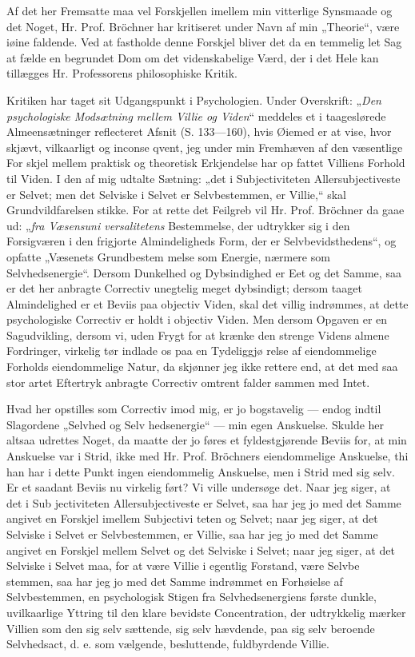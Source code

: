 \documentclass[12pt]{book}
\newcommand{\opage}[1]{\marginnote{\footnotesize\textit{[#1]}}}
\begin{document}
Af det her Fremsatte maa vel Forskjellen imellem
\opage{20}\setcounter{footnote}{0}%
min vitterlige Synsmaade og det Noget, Hr. Prof. Bröchner
har kritiseret under Navn af min „Theorie“, være iøine\-%
faldende. Ved at fastholde denne Forskjel bliver det da
en temmelig let Sag at fælde en begrundet Dom om det
videnskabelige Værd, der i det Hele kan tillægges Hr.
Professorens philosophiske Kritik.

Kritiken har taget sit Udgangspunkt i Psychologien.
Under Overskrift: „\emph{Den psychologiske Modsætning
mellem Villie og Viden}“ meddeles et i taageslørede
Almeensætninger reflecteret Afsnit (S. 133---160), hvis
Øiemed er at vise, hvor skjævt, vilkaarligt og inconse\-%
qvent, jeg under min Fremhæven af den væsentlige For\-%
skjel mellem praktisk og theoretisk Erkjendelse har op\-%
fattet Villiens Forhold til Viden. I den af mig udtalte
Sætning: „det i Subjectiviteten Allersubjectiveste er Selvet;
men det Selviske i Selvet er Selvbestemmen, er Villie,“
skal Grundvildfarelsen stikke. For at rette det Feilgreb
vil Hr. Prof. Bröchner da gaae ud: „\emph{fra Væsensuni\-%
versalitetens} Bestemmelse, der udtrykker sig i den
Forsigværen i den frigjorte Almindeligheds Form, der er
Selvbevidsthedens“, og opfatte „Væsenets Grundbestem\-%
melse som Energie, nærmere som Selvhedsenergie“.
Dersom Dunkelhed og Dybsindighed er Eet og det
Samme, saa er det her anbragte Correctiv unegtelig
meget dybsindigt; dersom taaget Almindelighed er et
Beviis paa objectiv Viden, skal det villig indrømmes, at
dette psychologiske Correctiv er holdt i objectiv Viden.
Men dersom Opgaven er en Sagudvikling, dersom vi,
uden Frygt for at krænke den strenge Videns almene
Fordringer, virkelig tør indlade os paa en Tydeliggjø\-%
relse af eiendommelige Forholds eiendommelige Natur,
da skjønner jeg ikke rettere end, at det med saa stor\-%
artet Eftertryk anbragte Correctiv omtrent falder sammen
med Intet.

\opage{21}\setcounter{footnote}{0}%
Hvad her opstilles som Correctiv imod mig, er jo
bogstavelig --- endog indtil Slagordene „Selvhed og Selv\-%
hedsenergie“ --- min egen Anskuelse. Skulde her altsaa
udrettes Noget, da maatte der jo føres et fyldestgjørende
Beviis for, at min Anskuelse var i Strid, ikke med Hr.
Prof. Bröchners eiendommelige Anskuelse, thi han har i
dette Punkt ingen eiendommelig Anskuelse, men i Strid
med sig selv. Er et saadant Beviis nu virkelig ført?
Vi ville undersøge det. Naar jeg siger, at det i Sub\-%
jectiviteten Allersubjectiveste er Selvet, saa har jeg jo
med det Samme angivet en Forskjel imellem Subjectivi\-%
teten og Selvet; naar jeg siger, at det Selviske i Selvet
er Selvbestemmen, er Villie, saa har jeg jo med det
Samme angivet en Forskjel mellem Selvet og det Selviske
i Selvet; naar jeg siger, at det Selviske i Selvet maa,
for at være Villie i egentlig Forstand, være Selvbe\-%
stemmen, saa har jeg jo med det Samme indrømmet en
Forhøielse af Selvbestemmen, en psychologisk Stigen fra
Selvhedsenergiens første dunkle, uvilkaarlige Yttring til
den klare bevidste Concentration, der udtrykkelig mærker
Villien som den sig selv sættende, sig selv hævdende,
paa sig selv beroende Selvhedsact, d. e. som vælgende,
besluttende, fuldbyrdende Villie.
\end{document}
